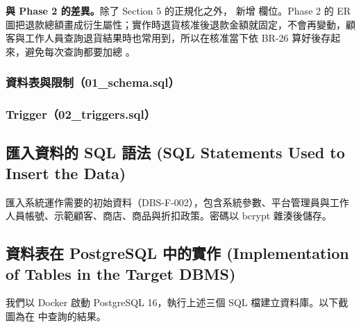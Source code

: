 \textbf{與 Phase 2 的差異。}除了 Section 5 的正規化之外， 新增  欄位。Phase 2 的 ER 圖把退款總額畫成衍生屬性；實作時退貨核准後退款金額就固定，不會再變動，顧客與工作人員查詢退貨結果時也常用到，所以在核准當下依 BR-26 算好後存起來，避免每次查詢都要加總 。

\subsubsection{資料表與限制（01\_schema.sql）}

\subsubsection{Trigger（02\_triggers.sql）}

\clearpage
\subsection{匯入資料的 SQL 語法 (SQL Statements Used to Insert the Data)}

 匯入系統運作需要的初始資料（DBS-F-002），包含系統參數、平台管理員與工作人員帳號、示範顧客、商店、商品與折扣政策。密碼以 bcrypt 雜湊後儲存。


\clearpage
\subsection{資料表在 PostgreSQL 中的實作 (Implementation of Tables in the Target DBMS)}

我們以 Docker 啟動 PostgreSQL 16，執行上述三個 SQL 檔建立資料庫。以下截圖為在  中查詢的結果。




